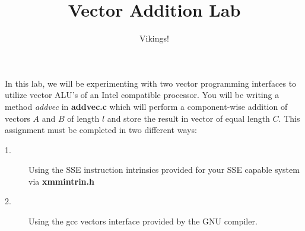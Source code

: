 \documentclass[12pt]{article}
\title{Vector Addition Lab}
\author{Vikings!}
\begin{document}
\maketitle

\par In this lab, we will be experimenting with two vector programming interfaces to utilize vector ALU's of an Intel compatible processor.
You will be writing a method \textit{addvec} in \textbf{addvec.c} which will perform a component-wise addition of vectors $A$ and $B$ of length $l$ and store the result in vector of equal length $C$.
This assignment must be completed in two different ways:

\begin{description}
\item[1.] Using the SSE instruction intrinsics provided for your SSE capable system via \textbf{xmmintrin.h}
\item[2.] Using the gcc vectors interface provided by the GNU compiler.
\end{description}
\end{document}

